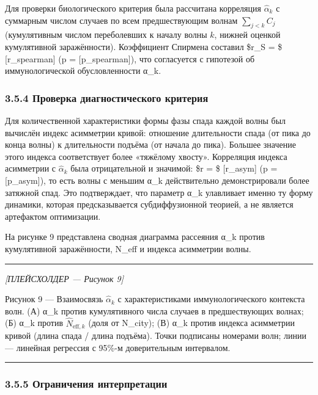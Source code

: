 \documentclass[12pt]{article}
\begin{document}
Для проверки биологического критерия была рассчитана корреляция
\(\hat{\alpha}_k\) с суммарным числом случаев по всем предшествующим
волнам \(\sum_{j<k} C_j\) (кумулятивным числом переболевших к началу
волны \(k\), нижней оценкой кумулятивной заражённости). Коэффициент
Спирмена составил \$r\_S = \$ {[}r\_spearman{]} (p = {[}p\_spearman{]}),
что согласуется с гипотезой об иммунологической обусловленности α\_k.

\subsubsection{3.5.4 Проверка диагностического
критерия}\label{ux43fux440ux43eux432ux435ux440ux43aux430-ux434ux438ux430ux433ux43dux43eux441ux442ux438ux447ux435ux441ux43aux43eux433ux43e-ux43aux440ux438ux442ux435ux440ux438ux44f}

Для количественной характеристики формы фазы спада каждой волны был
вычислён индекс асимметрии кривой: отношение длительности спада (от пика
до конца волны) к длительности подъёма (от начала до пика). Большее
значение этого индекса соответствует более «тяжёлому хвосту». Корреляция
индекса асимметрии с \(\hat{\alpha}_k\) была отрицательной и значимой:
\$r = \$ {[}r\_asym{]} (p = {[}p\_asym{]}), то есть волны с меньшим α\_k
действительно демонстрировали более затяжной спад. Это подтверждает, что
параметр α\_k улавливает именно ту форму динамики, которая
предсказывается субдиффузионной теорией, а не является артефактом
оптимизации.

На рисунке 9 представлена сводная диаграмма рассеяния α\_k против
кумулятивной заражённости, N\_eff и индекса асимметрии волны.

\begin{center}\rule{0.5\linewidth}{0.5pt}\end{center}

\emph{{[}ПЛЕЙСХОЛДЕР --- Рисунок 9{]}}

Рисунок 9 --- Взаимосвязь \(\hat{\alpha}_k\) с характеристиками
иммунологического контекста волн. (А) α\_k против кумулятивного числа
случаев в предшествующих волнах; (Б) α\_k против
\(\hat{N}_{\text{eff},k}\) (доля от N\_city); (В) α\_k против индекса
асимметрии кривой (длина спада / длина подъёма). Точки подписаны
номерами волн; линии --- линейная регрессия с 95\%-м доверительным
интервалом.

\begin{center}\rule{0.5\linewidth}{0.5pt}\end{center}

\subsubsection{3.5.5 Ограничения
интерпретации}\label{ux43eux433ux440ux430ux43dux438ux447ux435ux43dux438ux44f-ux438ux43dux442ux435ux440ux43fux440ux435ux442ux430ux446ux438ux438}
\end{document}

